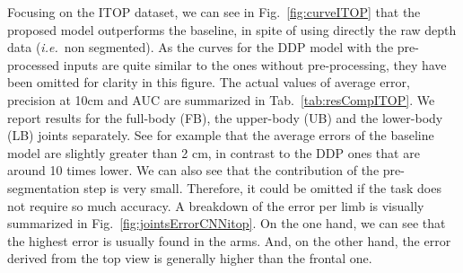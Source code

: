 \documentclass[review,12pt,3p]{elsarticle}
\def \ie{\textit{i.e.}}
\begin{document}
Focusing on the ITOP dataset, we can see in Fig.~\ref{fig:curveITOP} that the proposed model outperforms the baseline, in spite of using directly the raw depth data (\ie~non segmented). As the curves for the DDP model with the pre-processed inputs are quite similar to the ones without pre-processing, they have been omitted for clarity in this figure.
The actual values of average error, precision at 10cm and AUC are summarized in Tab.~\ref{tab:resCompITOP}. We report results for the full-body (FB), the upper-body (UB) and the lower-body (LB) joints separately.
See for example that the average errors of the baseline model are slightly greater than 2 cm, in contrast to the DDP ones that are around 10 times lower.
We can also see that the contribution of the pre-segmentation step is very small. Therefore, it could be omitted if the task does not require so much accuracy.
A breakdown of the error per limb is visually summarized in Fig.~\ref{fig:jointsErrorCNNitop}. On the one hand, we can see that the highest error is usually found in the arms. And, on the other hand, the error derived from the top view is generally higher than the frontal one.
\end{document}
